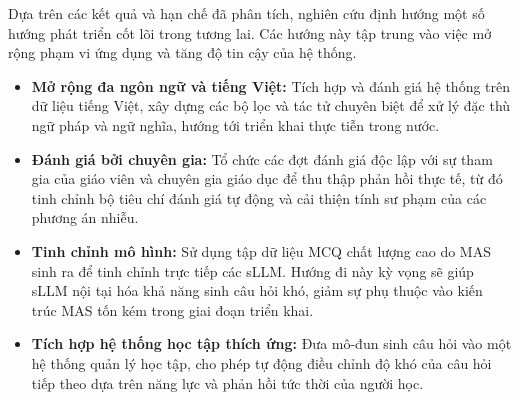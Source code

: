 Dựa trên các kết quả và hạn chế đã phân tích, nghiên cứu định hướng một số hướng phát triển cốt lõi trong tương lai. Các hướng này tập trung vào việc mở rộng phạm vi ứng dụng và tăng độ tin cậy của hệ thống.
\begin{itemize}
    \item \textbf{Mở rộng đa ngôn ngữ và tiếng Việt:} Tích hợp và đánh giá hệ thống trên dữ liệu tiếng Việt, xây dựng các bộ lọc và tác tử chuyên biệt để xử lý đặc thù ngữ pháp và ngữ nghĩa, hướng tới triển khai thực tiễn trong nước.
    \item \textbf{Đánh giá bởi chuyên gia:} Tổ chức các đợt đánh giá độc lập với sự tham gia của giáo viên và chuyên gia giáo dục để thu thập phản hồi thực tế, từ đó tinh chỉnh bộ tiêu chí đánh giá tự động và cải thiện tính sư phạm của các phương án nhiễu.
    \item \textbf{Tinh chỉnh mô hình:} Sử dụng tập dữ liệu MCQ chất lượng cao do MAS sinh ra để tinh chỉnh trực tiếp các sLLM. Hướng đi này kỳ vọng sẽ giúp sLLM nội tại hóa khả năng sinh câu hỏi khó, giảm sự phụ thuộc vào kiến trúc MAS tốn kém trong giai đoạn triển khai.
    \item \textbf{Tích hợp hệ thống học tập thích ứng:} Đưa mô-đun sinh câu hỏi vào một hệ thống quản lý học tập, cho phép tự động điều chỉnh độ khó của câu hỏi tiếp theo dựa trên năng lực và phản hồi tức thời của người học.
\end{itemize}
